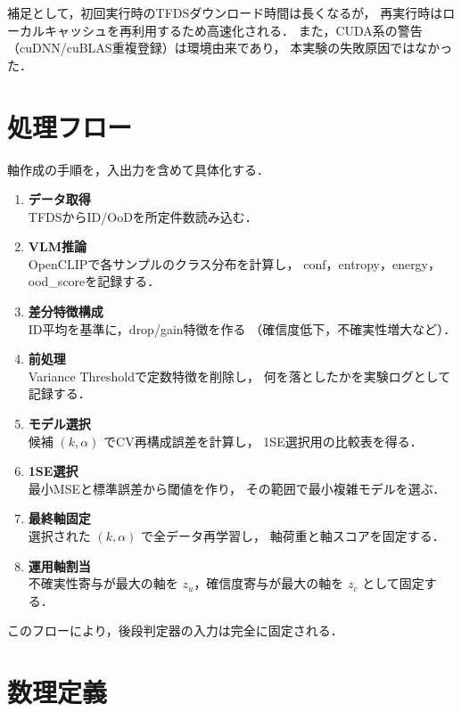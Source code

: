\documentclass[11pt,a4paper]{article}
\begin{document}
補足として，初回実行時のTFDSダウンロード時間は長くなるが，
再実行時はローカルキャッシュを再利用するため高速化される．
また，CUDA系の警告（cuDNN/cuBLAS重複登録）は環境由来であり，
本実験の失敗原因ではなかった．

\section{処理フロー}
軸作成の手順を，入出力を含めて具体化する．

\begin{enumerate}
  \item \textbf{データ取得}\\
  TFDSからID/OoDを所定件数読み込む．

  \item \textbf{VLM推論}\\
  OpenCLIPで各サンプルのクラス分布を計算し，
  $\mathrm{conf}$，entropy，energy，ood\_scoreを記録する．

  \item \textbf{差分特徴構成}\\
  ID平均を基準に，drop/gain特徴を作る
  （確信度低下，不確実性増大など）．

  \item \textbf{前処理}\\
  Variance Thresholdで定数特徴を削除し，
  何を落としたかを実験ログとして記録する．

  \item \textbf{モデル選択}\\
  候補 $(k,\alpha)$ でCV再構成誤差を計算し，
  1SE選択用の比較表を得る．

  \item \textbf{1SE選択}\\
  最小MSEと標準誤差から閾値を作り，
  その範囲で最小複雑モデルを選ぶ．

  \item \textbf{最終軸固定}\\
  選択された $(k,\alpha)$ で全データ再学習し，
  軸荷重と軸スコアを固定する．

  \item \textbf{運用軸割当}\\
  不確実性寄与が最大の軸を $z_u$，確信度寄与が最大の軸を $z_c$ として固定する．
\end{enumerate}

このフローにより，後段判定器の入力は完全に固定される．

\section{数理定義}
\end{document}
